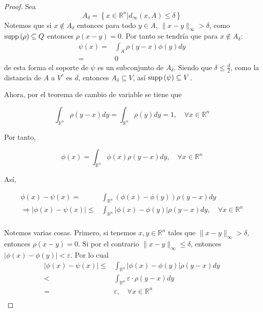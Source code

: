 \documentclass[12pt]{report}
\theoremstyle{largebreak}
\newcommand\abs[1]{\ensuremath{\lvert#1\rvert}}
\newcommand\supp[1]{\ensuremath{\textup{supp}\left(#1\right)}}
\begin{document}
\begin{proof}
    Sea
    \begin{equation*}
        A_{\delta}=\left\{x\in\mathbb{R}^n|d_{\infty}(x,A)\leq\delta\right\}
    \end{equation*}
    Notemos que si $x\notin A_\delta$ entonces para todo $y\in A$, $\|x-y\|_{\infty}>\delta$, como $\supp{\rho}\subseteq Q$ entonces $\rho(x-y)=0$. Por tanto se tendría que
    para $x\notin A_\delta$:
    \begin{equation*}
        \begin{split}
            \psi(x)=&\int_{A}\rho(y-x)\phi(y)dy\\
            =&0
        \end{split}
    \end{equation*}
    de esta forma el soporte de $\psi$ es un subconjunto de $A_\delta$. Siendo que $\delta\leq\frac{d}{2}$, como la distancia de $A$ a $V^c$ es $d$, entonces $A_\delta\subseteq V$, así $\supp{\psi}\subseteq V$.

    Ahora, por el teorema de cambio de variable se tiene que
    
    \begin{equation*}
        \int_{\mathbb{R}^n}\rho(y-x)dy=\int_{\mathbb{R}^n}\rho(y)dy=1,\quad\forall x\in\mathbb{R}^n
    \end{equation*}

    Por tanto,

    \begin{equation*}
        \phi(x)=\int_{\mathbb{R}^n}\phi(x)\rho(y-x)dy,\quad \forall x\in\mathbb{R}^n
    \end{equation*}

    Así,

    \begin{equation*}
        \begin{split}
            \phi(x)-\psi(x)=&\int_{\mathbb{R}^n}\left(\phi(x)-\phi(y)\right)\rho(y-x)dy\\
            \Rightarrow \abs{\phi(x)-\psi(x)}\leq&\int_{\mathbb{R}^n}\abs{\phi(x)-\phi(y)}\rho(y-x)dy,\quad \forall x\in\mathbb{R}^n\\
        \end{split}
    \end{equation*}
    
    Notemos varias cosas. Primero, si tenemos $x,y\in\mathbb{R}^n$ tales que $\|x-y\|_\infty>\delta$, entonces $\rho(x-y)=0$. Si por el contrario $\|x-y\|_\infty\leq\delta$, entonces $\abs{\phi(x)-\phi(y)}<\varepsilon$. Por lo cual
    \begin{equation*}
        \begin{split}
            \abs{\phi(x)-\psi(x)}\leq&\int_{\mathbb{R}^n}\abs{\phi(x)-\phi(y)}\rho(y-x)dy\\
            <&\int_{\mathbb{R}^n}\varepsilon\cdot\rho(y-x)dy\\
            =&\varepsilon,\quad\forall x\in\mathbb{R}^n\\
        \end{split}
    \end{equation*}
    

\end{proof}
\end{document}
